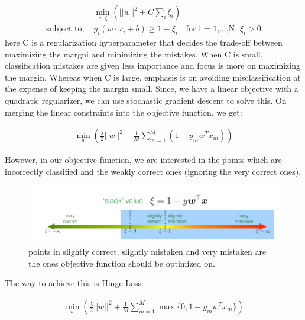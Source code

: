 \documentclass[11pt]{article}
\begin{document}
 	\begin{equation}
	\begin{aligned}
	&\min_{w, \xi} \left(||w||^2 + C\sum_i \xi_i\right)\\
	\text{subject to, }  &y_i(w\cdot x_i + b) \geq 1 - \xi_i \text{   }
    \text{  for i = 1,...,N, }\xi_i > 0
	\end{aligned}
	\end{equation}
	here C is a regularization hyperparameter that decides the trade-off between maximizing the margni and minimizing the mistakes. When C is small, classification mistakes are given less importance and focus is more on maximizing the margin. Whereas when C is large, emphasis is on avoiding misclassification at the expense of keeping the margin small. Since, we have a linear objective with a quadratic regularizer, we can use stochastic gradient descent to solve this. On merging the linear constraints into the objective function, we get:
	
	\begin{equation}
	\begin{aligned}
	\min_w \left(\frac{\lambda}{2}||w||^2 + \frac{1}{M} \sum_{m=1}^{M} (1 - y_mw^Tx_m) \right)
	\end{aligned}
	\end{equation}
	
	However, in our objective function, we are interested in the points which are incorrectly classified and the weakly correct ones (ignoring the very correct ones). 
	\begin{figure}[h!]
    \centering
    \includegraphics[scale=0.4]{images/xi.png}
    \caption{points in slightly correct, slightly mistaken and very mistaken are the ones objective function should be optimized on.}
    \label{fig:method}
    \end{figure}
    
    The way to achieve this is Hinge Loss:
	
    \begin{equation}
	\begin{aligned}
	\min_w \left(\frac{\lambda}{2}||w||^2 + \frac{1}{M} \sum_{m=1}^{M} \max \{0,1 - y_mw^Tx_m\} \right)
	\end{aligned}
	\end{equation}
	
\end{document}
